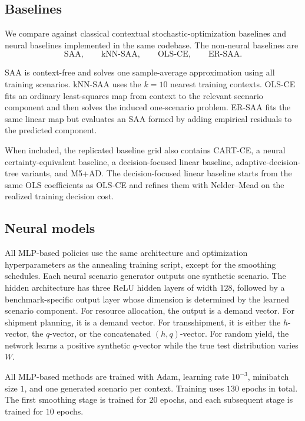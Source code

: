 \subsection{Baselines}

We compare against classical contextual stochastic-optimization baselines and neural baselines implemented in the same codebase. The non-neural baselines are
\[
\text{SAA},
\qquad
\text{kNN-SAA},
\qquad
\text{OLS-CE},
\qquad
\text{ER-SAA}.
\]

SAA is context-free and solves one sample-average approximation using all training scenarios. kNN-SAA uses the $k=10$ nearest training contexts. OLS-CE fits an ordinary least-squares map from context to the relevant scenario component and then solves the induced one-scenario problem. ER-SAA fits the same linear map but evaluates an SAA formed by adding empirical residuals to the predicted component.

When included, the replicated baseline grid also contains CART-CE, a neural certainty-equivalent baseline, a decision-focused linear baseline, adaptive-decision-tree variants, and M5+AD. The decision-focused linear baseline starts from the same OLS coefficients as OLS-CE and refines them with Nelder--Mead on the realized training decision cost.

\subsection{Neural models}

All MLP-based policies use the same architecture and optimization hyperparameters as the annealing training script, except for the smoothing schedules. Each neural scenario generator outputs one synthetic scenario. The hidden architecture has three ReLU hidden layers of width $128$, followed by a benchmark-specific output layer whose dimension is determined by the learned scenario component. For resource allocation, the output is a demand vector. For shipment planning, it is a demand vector. For transshipment, it is either the $h$-vector, the $q$-vector, or the concatenated $(h,q)$-vector. For random yield, the network learns a positive synthetic $q$-vector while the true test distribution varies $W$.

All MLP-based methods are trained with Adam, learning rate $10^{-3}$, minibatch size $1$, and one generated scenario per context. Training uses $130$ epochs in total. The first smoothing stage is trained for $20$ epochs, and each subsequent stage is trained for $10$ epochs.

